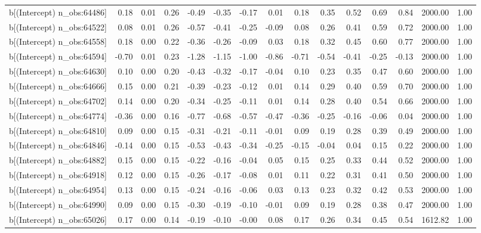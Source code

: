 \begin{table}[ht]
\begin{tabular}{rrrrrrrrrrrrrrr}
  b[(Intercept) n\_obs:64486] & 0.18 & 0.01 & 0.26 & -0.49 & -0.35 & -0.17 & 0.01 & 0.18 & 0.35 & 0.52 & 0.69 & 0.84 & 2000.00 & 1.00 \\ 
  b[(Intercept) n\_obs:64522] & 0.08 & 0.01 & 0.26 & -0.57 & -0.41 & -0.25 & -0.09 & 0.08 & 0.26 & 0.41 & 0.59 & 0.72 & 2000.00 & 1.00 \\ 
  b[(Intercept) n\_obs:64558] & 0.18 & 0.00 & 0.22 & -0.36 & -0.26 & -0.09 & 0.03 & 0.18 & 0.32 & 0.45 & 0.60 & 0.77 & 2000.00 & 1.00 \\ 
  b[(Intercept) n\_obs:64594] & -0.70 & 0.01 & 0.23 & -1.28 & -1.15 & -1.00 & -0.86 & -0.71 & -0.54 & -0.41 & -0.25 & -0.13 & 2000.00 & 1.00 \\ 
  b[(Intercept) n\_obs:64630] & 0.10 & 0.00 & 0.20 & -0.43 & -0.32 & -0.17 & -0.04 & 0.10 & 0.23 & 0.35 & 0.47 & 0.60 & 2000.00 & 1.00 \\ 
  b[(Intercept) n\_obs:64666] & 0.15 & 0.00 & 0.21 & -0.39 & -0.23 & -0.12 & 0.01 & 0.14 & 0.29 & 0.40 & 0.59 & 0.70 & 2000.00 & 1.00 \\ 
  b[(Intercept) n\_obs:64702] & 0.14 & 0.00 & 0.20 & -0.34 & -0.25 & -0.11 & 0.01 & 0.14 & 0.28 & 0.40 & 0.54 & 0.66 & 2000.00 & 1.00 \\ 
  b[(Intercept) n\_obs:64774] & -0.36 & 0.00 & 0.16 & -0.77 & -0.68 & -0.57 & -0.47 & -0.36 & -0.25 & -0.16 & -0.06 & 0.04 & 2000.00 & 1.00 \\ 
  b[(Intercept) n\_obs:64810] & 0.09 & 0.00 & 0.15 & -0.31 & -0.21 & -0.11 & -0.01 & 0.09 & 0.19 & 0.28 & 0.39 & 0.49 & 2000.00 & 1.00 \\ 
  b[(Intercept) n\_obs:64846] & -0.14 & 0.00 & 0.15 & -0.53 & -0.43 & -0.34 & -0.25 & -0.15 & -0.04 & 0.04 & 0.15 & 0.22 & 2000.00 & 1.00 \\ 
  b[(Intercept) n\_obs:64882] & 0.15 & 0.00 & 0.15 & -0.22 & -0.16 & -0.04 & 0.05 & 0.15 & 0.25 & 0.33 & 0.44 & 0.52 & 2000.00 & 1.00 \\ 
  b[(Intercept) n\_obs:64918] & 0.12 & 0.00 & 0.15 & -0.26 & -0.17 & -0.08 & 0.01 & 0.11 & 0.22 & 0.31 & 0.41 & 0.50 & 2000.00 & 1.00 \\ 
  b[(Intercept) n\_obs:64954] & 0.13 & 0.00 & 0.15 & -0.24 & -0.16 & -0.06 & 0.03 & 0.13 & 0.23 & 0.32 & 0.42 & 0.53 & 2000.00 & 1.00 \\ 
  b[(Intercept) n\_obs:64990] & 0.09 & 0.00 & 0.15 & -0.30 & -0.19 & -0.10 & -0.01 & 0.09 & 0.19 & 0.28 & 0.38 & 0.47 & 2000.00 & 1.00 \\ 
  b[(Intercept) n\_obs:65026] & 0.17 & 0.00 & 0.14 & -0.19 & -0.10 & -0.00 & 0.08 & 0.17 & 0.26 & 0.34 & 0.45 & 0.54 & 1612.82 & 1.00 \\ 

\end{tabular}
\end{table}
